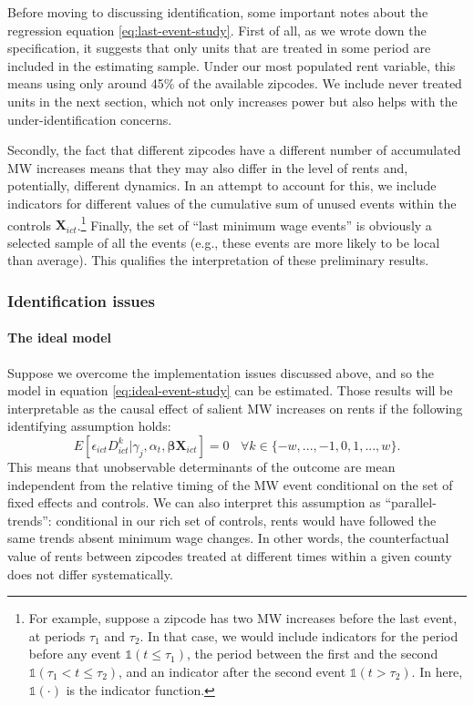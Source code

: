     Before moving to discussing identification, some important notes about the regression equation \eqref{eq:last-event-study}. First of all, as we wrote down the specification, it suggests that only units that are treated in some period are included in the estimating sample. Under our most populated rent variable, this means using only around 45\% of the available zipcodes. We include never treated units in the next section, which not only increases power but also helps with the under-identification concerns. 
    
    Secondly, the fact that different zipcodes have a different number of accumulated MW increases means that they may also differ in the level of rents and, potentially, different dynamics. In an attempt to account for this, we include indicators for different values of the cumulative sum of unused events within the controls $\boldsymbol{X}_{ict}$.\footnote{For example, suppose a zipcode has two MW increases before the last event, at periods $\tau_1$ and $\tau_2$. In that case, we would include indicators for the period before any event $\mathds{1}\left(t \leq \tau_1\right)$, the period between the first and the second $\mathds{1}\left(\tau_1 <  t \leq \tau_2 \right)$, and an indicator after the second event $\mathds{1}\left(t > \tau_2\right)$. In here, $\mathds{1} (\cdot)$ is the indicator function.} Finally, the set of ``last minimum wage events'' is obviously a selected sample of all the events (e.g., these events are more likely to be local than average). This qualifies the interpretation of these preliminary results.

\subsubsection{Identification issues}
    
    \paragraph{The ideal model}
    
    Suppose we overcome the implementation issues discussed above, and so the model in equation \eqref{eq:ideal-event-study} can be estimated. Those results will be interpretable as the causal effect of salient MW increases on rents if the following identifying assumption holds: $$E \left[ \epsilon_{ict} D_{ict}^k \big| \gamma_j, \alpha_{t}, \boldsymbol{\beta} \boldsymbol{X}_{ict}\right]  = 0 \ \ \ \ \forall k\in\{-w, ..., -1, 0, 1, ..., w\}. $$ This means that unobservable determinants of the outcome are mean independent from the relative timing of the MW event conditional on the set of fixed effects and controls. We can also interpret this assumption as ``parallel-trends'': conditional in our rich set of controls, rents would have followed the same trends absent minimum wage changes. In other words, the counterfactual value of rents between zipcodes treated at different times within a given county does not differ systematically.
    
